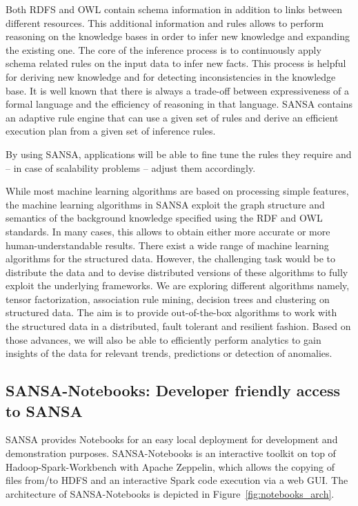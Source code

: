 Both RDFS and \gls{OWL} contain schema information in addition to links between different resources. 
This additional information and rules allows to perform reasoning on the knowledge bases in order to infer new knowledge and expanding the existing one. 
The core of the inference process is to continuously apply schema related rules on the input data to infer new facts. 
This process is helpful for deriving new knowledge and for detecting inconsistencies in the knowledge base.
It is well known that there is always a trade-off between expressiveness of a formal language and the efficiency of reasoning in that language. 
SANSA contains an adaptive rule engine that can use a given set of rules and derive an efficient execution plan from a given set of inference rules.

By using SANSA, applications will be able to fine tune the rules they require and -- in case of scalability problems -- adjust them accordingly.

While most machine learning algorithms are based on processing simple features, the machine learning algorithms in SANSA exploit the graph structure and semantics of the background knowledge specified using the \gls{RDF} and \gls{OWL} standards. 
In many cases, this allows to obtain either more accurate or more human-understandable results.
There exist a wide range of machine learning algorithms for the structured data. 
However, the challenging task would be to distribute the data and to devise distributed versions of these algorithms to fully exploit the underlying frameworks. 
We are exploring different algorithms namely, tensor factorization, association rule mining, decision trees and clustering on structured data. 
The aim is to provide out-of-the-box algorithms to work with the structured data in a distributed, fault tolerant and resilient fashion.
Based on those advances, we will also be able to efficiently perform analytics to gain insights of the data for relevant trends, predictions or detection of anomalies.

\subsection{SANSA-Notebooks: Developer friendly access to SANSA}

SANSA provides Notebooks for an easy local deployment for development and demonstration purposes.
SANSA-Notebooks is an interactive toolkit on top of Hadoop-Spark-Workbench with Apache Zeppelin, which allows the copying of files from/to \gls{HDFS} and an interactive Spark code execution via a web GUI.
The architecture of SANSA-Notebooks is depicted in Figure~\ref{fig:notebooks_arch}.

